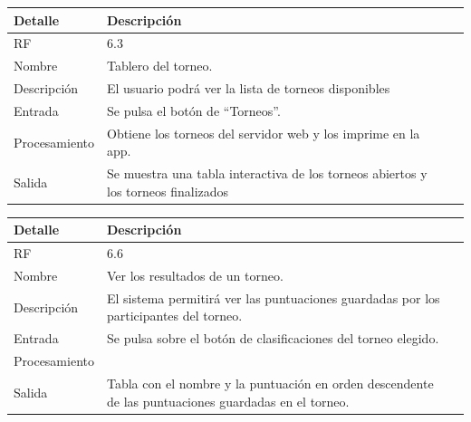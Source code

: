 \documentclass{article}
\begin{document}
\begin{table}[H]
  \begin{center}
    \begin{tabularx}{\linewidth}{|X|X|X|} %
      \hline
      \textbf{Detalle} & \textbf{Descripción}\\
      \hline
      RF & 6.3 \\
      \hline
      Nombre & Tablero del torneo.\\
      \hline
      Descripción & El usuario podrá ver la lista de torneos disponibles\\
      \hline
      Entrada & Se pulsa el botón de “Torneos”.\\
      \hline
      Procesamiento & Obtiene los torneos del servidor web y los imprime en la app.\\
      \hline
      Salida & Se muestra una tabla interactiva de los torneos abiertos y los torneos finalizados\\
      \hline
    \end{tabularx}
  \end{center}
\end{table}

\begin{table}[H]
  \begin{center}
    \begin{tabularx}{\linewidth}{|X|X|X|} %
      \hline
      \textbf{Detalle} & \textbf{Descripción}\\
      \hline
      RF & 6.6 \\
      \hline
      Nombre & Ver los resultados de un torneo.\\
      \hline
      Descripción & El sistema permitirá ver las puntuaciones guardadas por los participantes del torneo.\\
      \hline
      Entrada & Se pulsa sobre el botón de clasificaciones del torneo elegido.\\
      \hline
      Procesamiento & \\
      \hline
      Salida & Tabla con el nombre y la puntuación en orden descendente de las puntuaciones guardadas en el torneo.\\
      \hline
    \end{tabularx}
  \end{center}
\end{table}
\end{document}
